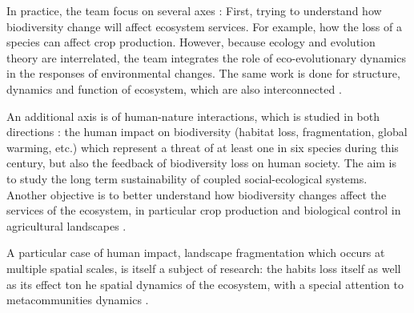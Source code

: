 \documentclass{article}
\begin{document}
In practice, the team focus on several axes : 
 First, trying to understand how biodiversity change will affect ecosystem services. For example, how the loss of a species can affect crop production. However, because ecology and evolution theory are interrelated, the team integrates the role of eco-evolutionary dynamics in the responses of environmental changes. The same work is done for structure, dynamics and function of ecosystem, which are also interconnected \cite{bastazini2019loss}\cite{bideault2019temperature}\cite{galiana2019geographical}.

An additional axis is of human-nature interactions, which is studied in both directions : the human impact on biodiversity (habitat loss, fragmentation, global warming, etc.) which represent a threat of at least one in six species during this century, but also the feedback of biodiversity loss on human society. The aim is to study the long term sustainability of coupled social-ecological systems. Another objective is to better understand how biodiversity changes affect the services of the ecosystem, in particular  crop production and biological control in agricultural landscapes
\cite{cazalis2018we}\cite{lafuite2018sustainable}\cite{montoya2018trade}\cite{montoya2019trade}.

A particular case of human impact, landscape fragmentation which occurs at multiple spatial scales, is itself a subject of research: the habits loss itself as well as its effect ton he spatial dynamics of the ecosystem, with a special attention to metacommunities dynamics \cite{goncalves2018habitat}\cite{jacob2018habitat}.
\end{document}
